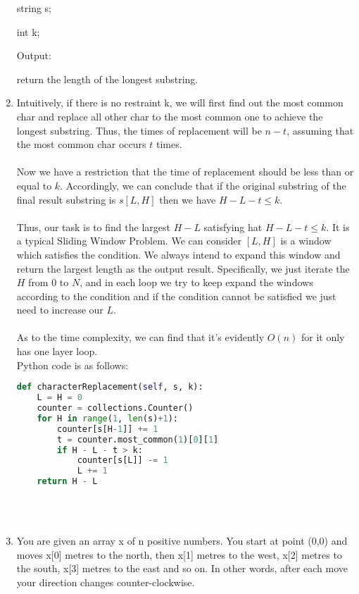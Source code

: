 \documentclass[12pt,a4paper]{article}
\makeatletter
\newtheorem*{solution}{Solution}
\renewenvironment{solution}[1][Solution] {\par\pushQED{\qed}\normalfont\topsep6\p@\@plus6\p@\relax\trivlist\item[\hskip\labelsep\bfseries#1\@addpunct{.}]\ignorespaces}{\popQED\endtrivlist\@endpefalse} \makeatother
\makeatother
\begin{document}
\begin{enumerate}
string s;

int k;

Output:

return the length of the longest substring.


\begin{solution}
Intuitively, if there is no restraint k, we will first find out the most common char and replace all other char to the most common one to achieve the longest substring. Thus, the times of replacement will be $n-t$, assuming that the most common char occurs $t$ times. \\ \\ Now we have a restriction that the time of replacement should be less than or equal to $k$. Accordingly, we can conclude that if the original substring of the final result substring is $s[L,H]$ then we have $H-L-t \le k$.\\ \\
Thus, our task is to find the largest $H-L$ satisfying hat $H-L-t \le k$. It is a typical Sliding Window Problem. We can consider $[L,H]$ is a window which satisfies the condition. We always intend to expand this window and return the largest length as the output result. Specifically, we just iterate the $H$ from $0$ to $N$, and in each loop we try to keep expand the windows according to the condition and if the condition cannot be satisfied we just need to increase our $L$.\\ \\
As to the time complexity, we can find that it's evidently $O(n)$ for it only has one layer loop.
\\ Python code is as follows:


\begin{lstlisting}[language=Python] 
def characterReplacement(self, s, k):
    L = H = 0
    counter = collections.Counter()
    for H in range(1, len(s)+1):
        counter[s[H-1]] += 1
        t = counter.most_common(1)[0][1]
        if H - L - t > k:
            counter[s[L]] -= 1
            L += 1
    return H - L
\end{lstlisting} 

\end{solution}

~\\
~\\


\item You are given an array x of n positive numbers. You start at point (0,0) and moves x[0] metres to the north, then x[1] metres to the west, x[2] metres to the south, x[3] metres to the east and so on. In other words, after each move your direction changes counter-clockwise.


\end{enumerate}
\end{document}
